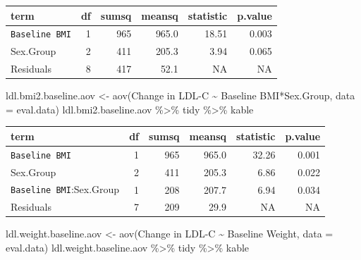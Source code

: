 \documentclass[
]{article}
\newenvironment{Shaded}{\begin{snugshade}}{\end{snugshade}}
\newcommand{\AttributeTok}[1]{\textcolor[rgb]{0.77,0.63,0.00}{#1}}
\newcommand{\FunctionTok}[1]{\textcolor[rgb]{0.00,0.00,0.00}{#1}}
\newcommand{\NormalTok}[1]{#1}
\newcommand{\OtherTok}[1]{\textcolor[rgb]{0.56,0.35,0.01}{#1}}
\newcommand{\SpecialCharTok}[1]{\textcolor[rgb]{0.00,0.00,0.00}{#1}}
\newcommand{\StringTok}[1]{\textcolor[rgb]{0.31,0.60,0.02}{#1}}
\begin{document}
\begin{longtable}[]{@{}lrrrrr@{}}
\toprule
term & df & sumsq & meansq & statistic & p.value \\
\midrule
\endhead
\texttt{Baseline\ BMI} & 1 & 965 & 965.0 & 18.51 & 0.003 \\
Sex.Group & 2 & 411 & 205.3 & 3.94 & 0.065 \\
Residuals & 8 & 417 & 52.1 & NA & NA \\
\bottomrule
\end{longtable}

\begin{Shaded}
\begin{Highlighting}[]
\NormalTok{ldl.bmi2.baseline.aov }\OtherTok{\textless{}{-}} \FunctionTok{aov}\NormalTok{(}\StringTok{\textasciigrave{}}\AttributeTok{Change in LDL{-}C}\StringTok{\textasciigrave{}} \SpecialCharTok{\textasciitilde{}} \StringTok{\textasciigrave{}}\AttributeTok{Baseline BMI}\StringTok{\textasciigrave{}}\SpecialCharTok{*}\StringTok{\textasciigrave{}}\AttributeTok{Sex.Group}\StringTok{\textasciigrave{}}\NormalTok{, }\AttributeTok{data =}\NormalTok{ eval.data)}
\NormalTok{ldl.bmi2.baseline.aov }\SpecialCharTok{\%\textgreater{}\%}\NormalTok{ tidy }\SpecialCharTok{\%\textgreater{}\%}\NormalTok{ kable}
\end{Highlighting}
\end{Shaded}

\begin{longtable}[]{@{}lrrrrr@{}}
\toprule
term & df & sumsq & meansq & statistic & p.value \\
\midrule
\endhead
\texttt{Baseline\ BMI} & 1 & 965 & 965.0 & 32.26 & 0.001 \\
Sex.Group & 2 & 411 & 205.3 & 6.86 & 0.022 \\
\texttt{Baseline\ BMI}:Sex.Group & 1 & 208 & 207.7 & 6.94 & 0.034 \\
Residuals & 7 & 209 & 29.9 & NA & NA \\
\bottomrule
\end{longtable}

\begin{Shaded}
\begin{Highlighting}[]
\NormalTok{ldl.weight.baseline.aov }\OtherTok{\textless{}{-}} \FunctionTok{aov}\NormalTok{(}\StringTok{\textasciigrave{}}\AttributeTok{Change in LDL{-}C}\StringTok{\textasciigrave{}} \SpecialCharTok{\textasciitilde{}} \StringTok{\textasciigrave{}}\AttributeTok{Baseline Weight}\StringTok{\textasciigrave{}}\NormalTok{, }\AttributeTok{data =}\NormalTok{ eval.data)}
\NormalTok{ldl.weight.baseline.aov }\SpecialCharTok{\%\textgreater{}\%}\NormalTok{ tidy }\SpecialCharTok{\%\textgreater{}\%}\NormalTok{ kable}
\end{Highlighting}
\end{Shaded}
\end{document}
